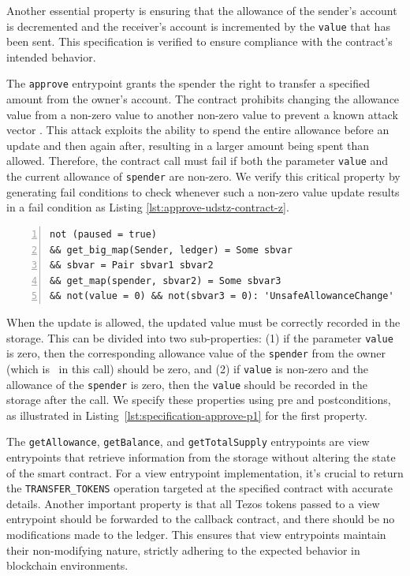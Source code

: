 \documentclass[runningheads]{llncs}
\begin{document}
Another essential property is ensuring that the allowance of the sender's account is decremented and the receiver's account is incremented by the \lstinline/value/ that has been sent. This specification is verified to ensure compliance with the contract's intended behavior.

The \texttt{approve} entrypoint grants the spender the right to transfer a specified amount from the owner's account. The contract prohibits changing the allowance value from a non-zero value to another non-zero value to prevent a known attack vector \cite{attack-vector}. This attack exploits the ability to spend the entire allowance before an update and then again after, resulting in a larger amount being spent than allowed. Therefore, the contract call must fail if both the parameter \lstinline/value/ and the current allowance of \lstinline/spender/ are non-zero. We verify this critical property by generating fail conditions to check whenever such a non-zero value update results in a fail condition as Listing \ref{lst:approve-udstz-contract-z}.
\begin{lstlisting}[float=tp,captionpos=b,caption={The non-zero value fail condition for the \lstinline/approve/ entrypoint},label={lst:approve-udstz-contract-z},numbers=left]
not (paused = true) 
&& get_big_map(Sender, ledger) = Some sbvar 
&& sbvar = Pair sbvar1 sbvar2 
&& get_map(spender, sbvar2) = Some sbvar3 
&& not(value = 0) && not(sbvar3 = 0): 'UnsafeAllowanceChange'
\end{lstlisting}

When the update is allowed, the updated value must be correctly recorded in the storage. This can be divided into two sub-properties: (1) if the parameter \lstinline/value/ is zero, then the corresponding allowance value of the \lstinline/spender/ from the owner (which is \SENDER\ in this call) should be zero, and (2) if \lstinline/value/ is non-zero and the allowance of the \lstinline/spender/ is zero, then the \lstinline/value/ should be recorded in the storage after the call. We specify these properties using pre and postconditions, as illustrated in Listing~\ref{lst:specification-approve-p1} for the first property.

The \lstinline/getAllowance/, \lstinline/getBalance/, and \lstinline/getTotalSupply/ entrypoints are view entrypoints that retrieve information from the storage without altering the state of the smart contract. For a view entrypoint implementation, it's crucial to return the \lstinline/TRANSFER_TOKENS/ operation targeted at the specified contract with accurate details. Another important property is that all Tezos tokens passed to a view entrypoint should be forwarded to the callback contract, and there should be no modifications made to the ledger. This ensures that view entrypoints maintain their non-modifying nature, strictly adhering to the expected behavior in blockchain environments.
\end{document}

